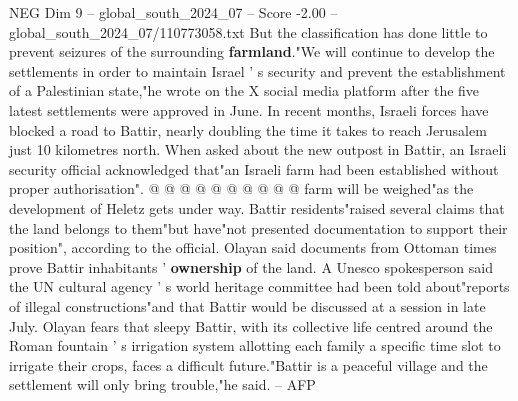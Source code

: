 \begin{textsample}{NEG Dim 9 – global\_south\_2024\_07 – Score -2.00 – global\_south\_2024\_07/110773058.txt}
But the classification has done little to prevent seizures of the surrounding \textbf{farmland}."We will continue to develop the settlements in order to maintain Israel ' s security and prevent the establishment of a Palestinian state,"he wrote on the X social media platform after the five latest settlements were approved in June.
In recent months, Israeli forces have blocked a road to Battir, nearly doubling the time it takes to reach Jerusalem just 10 kilometres north.
When asked about the new outpost in Battir, an Israeli security official acknowledged that"an Israeli farm had been established without proper authorisation". @ @ @ @ @ @ @ @ @ @ farm will be weighed"as the development of Heletz gets under way.
Battir residents"raised several claims that the land belongs to them"but have"not presented documentation to support their position", according to the official.
Olayan said documents from Ottoman times prove Battir inhabitants ' \textbf{ownership} of the land.
A Unesco spokesperson said the UN cultural agency ' s world heritage committee had been told about"reports of illegal constructions"and that Battir would be discussed at a session in late July.
Olayan fears that sleepy Battir, with its collective life centred around the Roman fountain ' s irrigation system allotting each family a specific time slot to irrigate their crops, faces a difficult future."Battir is a peaceful village and the settlement will only bring trouble,"he said. -- AFP

\end{textsample}
